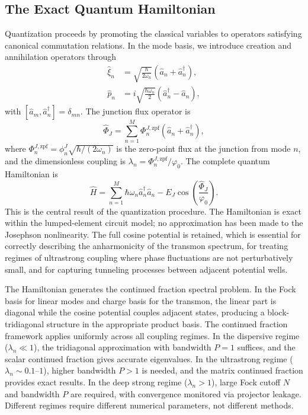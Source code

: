 \documentclass[reprint, floatfix, superscriptaddress, amsmath, amssymb, longbibliography]{revtex4-2}
\begin{document}
\subsection{The Exact Quantum Hamiltonian}
\label{sec:exact_hamiltonian}

Quantization proceeds by promoting the classical variables to operators satisfying canonical commutation relations. In the mode basis, we introduce creation and annihilation operators through
\begin{align}
\hat{\xi}_n &= \sqrt{\frac{\hbar}{2\omega_n}} (\hat{a}_n + \hat{a}_n^\dagger), \label{eq:ladder_ops_xi}\\
\hat{p}_n &= i\sqrt{\frac{\hbar\omega_n}{2}} (\hat{a}_n^\dagger - \hat{a}_n), \label{eq:ladder_ops_p}
\end{align}
with $[\hat{a}_m, \hat{a}_n^\dagger] = \delta_{mn}$. The junction flux operator is
\begin{equation}
\hat{\Phi}_J = \sum_{n=1}^{M} \Phi_n^{J,\mathrm{zpf}} (\hat{a}_n + \hat{a}_n^\dagger),
\label{eq:Phi_J_quantum}
\end{equation}
where $\Phi_n^{J,\mathrm{zpf}} = \phi_n^J \sqrt{\hbar/(2\omega_n)}$ is the zero-point flux at the junction from mode $n$, and the dimensionless coupling is $\lambda_n = \Phi_n^{J,\mathrm{zpf}}/\varphi_0$. The complete quantum Hamiltonian is
\begin{equation}
\hat{H} = \sum_{n=1}^{M} \hbar\omega_n \hat{a}_n^\dagger \hat{a}_n - E_J \cos\left( \frac{\hat{\Phi}_J}{\varphi_0} \right).
\label{eq:exact_hamiltonian}
\end{equation}
This is the central result of the quantization procedure. The Hamiltonian is exact within the lumped-element circuit model; no approximation has been made to the Josephson nonlinearity. The full cosine potential is retained, which is essential for correctly describing the anharmonicity of the transmon spectrum, for treating regimes of ultrastrong coupling where phase fluctuations are not perturbatively small, and for capturing tunneling processes between adjacent potential wells.

The Hamiltonian generates the continued fraction spectral problem. In the Fock basis for linear modes and charge basis for the transmon, the linear part is diagonal while the cosine potential couples adjacent states, producing a block-tridiagonal structure in the appropriate product basis. The continued fraction framework applies uniformly across all coupling regimes. In the dispersive regime ($\lambda_n \ll 1$), the tridiagonal approximation with bandwidth $P=1$ suffices, and the scalar continued fraction gives accurate eigenvalues. In the ultrastrong regime ($\lambda_n \sim 0.1$--$1$), higher bandwidth $P > 1$ is needed, and the matrix continued fraction provides exact results. In the deep strong regime ($\lambda_n > 1$), large Fock cutoff $N$ and bandwidth $P$ are required, with convergence monitored via projector leakage. Different regimes require different numerical parameters, not different methods.
\end{document}
